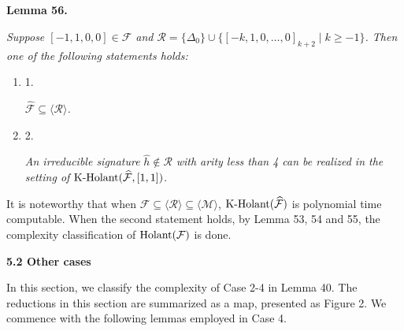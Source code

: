 \par\medskip\noindent\textbf{
\textbf{Lemma 56}\textbf{.}
}\par



\emph{Suppose $[-1,1,0,0]\in\widehat{\mathcal{F}}$ and $\mathcal{R}=\{\Delta_{0}\}\cup\{[-k,1,0,\ldots,0]_{k+2}\mid k\geq-1\}$. Then one of the following statements holds:}\par


\begin{enumerate}


\item[] 
1. 


$\widehat{\mathcal{F}}\subseteq\langle\mathcal{R}\rangle$\emph{.}\par





\item[] 
2. 


\emph{An irreducible signature }$\widehat{h}\notin\mathcal{R}$\emph{ with arity less than 4 can be realized in the setting of }$\textup{{K-Holant}}(\widehat{\mathcal{F}},[1,1])$\emph{.}\par





\end{enumerate}






It is noteworthy that when $\widehat{\mathcal{F}}\subseteq\langle\mathcal{R}\rangle\subseteq\langle\mathcal{M}\rangle$, $\textup{{K-Holant}}(\widehat{\mathcal{F}})$ is polynomial time computable. When the second statement holds, by Lemma 53, 54 and 55, the complexity classification of $\textup{{Holant}}(\mathcal{F})$ is done.\par





\par\medskip\noindent\textbf{
5.2 Other cases}\par




In this section, we classify the complexity of Case 2-4 in Lemma 40. The reductions in this section are summarized as a map, presented as Figure 2. We commence with the following lemmas employed in Case 4.\par



